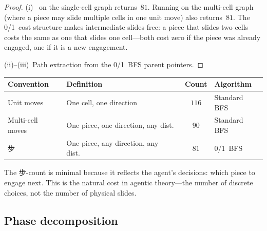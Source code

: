 \begin{proof}
(i)~ on the single-cell graph returns~$81$.
Running on the multi-cell graph (where a piece may slide
multiple cells in one unit move) also returns~$81$.
The 0/1~cost structure makes intermediate slides free:
a piece that slides two cells costs the same as one that
slides one cell---both cost zero if the piece was already
engaged, one if it is a new engagement.

(ii)--(iii)~Path extraction from the 0/1~BFS parent
pointers.
\end{proof}

\begin{remark}\label{rem:counting}
\begin{center}
\small
\begin{tabular}{@{}llcl@{}}
\toprule
\textbf{Convention} & \textbf{Definition} &
  \textbf{Count} & \textbf{Algorithm} \\
\midrule
Unit moves & One cell, one direction &
  $116$ & Standard BFS \\
Multi-cell moves & One piece, one direction, any dist.\ &
  $90$ & Standard BFS \\
步 & One piece, any direction, any dist.\ &
  $81$ & 0/1~BFS \\
\bottomrule
\end{tabular}
\end{center}
The 步-count is minimal because it reflects the
agent's decisions: which piece to engage next.
This is the natural cost in agentic theory---the number
of discrete choices, not the number of physical slides.
\end{remark}

\subsection*{Phase decomposition}

